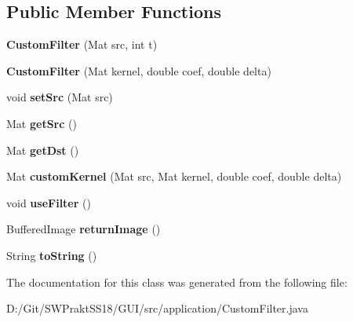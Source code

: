 \subsection*{Public Member Functions}
\begin{DoxyCompactItemize}
\item 
\mbox{\label{classapplication_1_1_custom_filter_ac7231a42a2d57e6f339f09f13babb851}} 
{\bfseries Custom\+Filter} (Mat src, int t)
\item 
\mbox{\label{classapplication_1_1_custom_filter_a85e963b6250b671e2e51eacc6d71bf46}} 
{\bfseries Custom\+Filter} (Mat kernel, double coef, double delta)
\item 
\mbox{\label{classapplication_1_1_custom_filter_ada27b3dfc022ed2451261bd7481ca447}} 
void {\bfseries set\+Src} (Mat src)
\item 
\mbox{\label{classapplication_1_1_custom_filter_af4f4ac3206fa277146686cc88d950a46}} 
Mat {\bfseries get\+Src} ()
\item 
\mbox{\label{classapplication_1_1_custom_filter_a3d8a5a1d9e763651602e7a8d17aa683f}} 
Mat {\bfseries get\+Dst} ()
\item 
\mbox{\label{classapplication_1_1_custom_filter_a8e28f52dc15ca7258d3cd40bae34268a}} 
Mat {\bfseries custom\+Kernel} (Mat src, Mat kernel, double coef, double delta)
\item 
\mbox{\label{classapplication_1_1_custom_filter_a30649ce4f855b77d80ae347f5732fd63}} 
void {\bfseries use\+Filter} ()
\item 
\mbox{\label{classapplication_1_1_custom_filter_a756ac798efbb20e4edfaaaa3cc663df8}} 
Buffered\+Image {\bfseries return\+Image} ()
\item 
\mbox{\label{classapplication_1_1_custom_filter_a3c4a6268f8b2406f2caed2b454726939}} 
String {\bfseries to\+String} ()
\end{DoxyCompactItemize}


The documentation for this class was generated from the following file\+:\begin{DoxyCompactItemize}
\item 
D\+:/\+Git/\+S\+W\+Prakt\+S\+S18/\+G\+U\+I/src/application/Custom\+Filter.\+java\end{DoxyCompactItemize}
